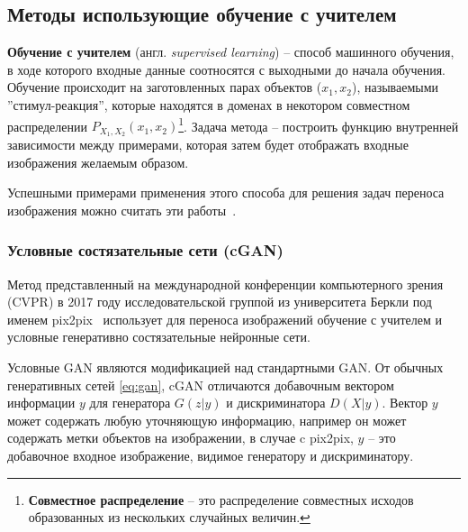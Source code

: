\documentclass[11pt,a4paper]{extarticle}
\begin{document}
	\subsection{Методы использующие обучение с учителем}
	
		\textbf{Обучение с учителем} (англ. \textit{supervised learning}) -- способ машинного обучения, в ходе которого входные данные соотносятся с выходными до начала обучения.
		Обучение происходит на заготовленных парах объектов (\(x_{1},x_{2}\)), называемыми ''стимул-реакция'', которые находятся в доменах в некотором совместном распределении \(P_{X_{1},X_{2}}(x_{1},x_{2})\)\footnote{
			\textbf{Совместное распределение} -- это распределение совместных исходов образованных из нескольких случайных величин.
		}.
		Задача метода -- построить функцию внутренней зависимости между примерами, которая затем будет отображать входные изображения желаемым образом.

		Успешными примерами применения этого способа для решения задач переноса изображения можно считать эти работы~\cite{BicycleGAN, pix2pix}.

		\subsubsection{Условные состязательные сети (cGAN)} \label{sec:pix2pix}

			Метод представленный на международной конференции компьютерного зрения (CVPR) в 2017 году
			исследовательской группой из университета Беркли под именем pix2pix~\cite{pix2pix}
			использует для переноса изображений обучение с учителем и условные генеративно состязательные нейронные сети.

			Условные GAN являются модификацией над стандартными GAN.
			От обычных генеративных сетей \eqref{eq:gan}, cGAN отличаются добавочным вектором информации $y$ для генератора \(G(z|y)\) и дискриминатора \(D(X|y)\).
			Вектор $y$ может содержать любую уточняющую информацию, например он может содержать метки объектов на изображении,
			в случае c pix2pix, $y$ -- это добавочное входное изображение, видимое генератору и дискриминатору.
\end{document}
